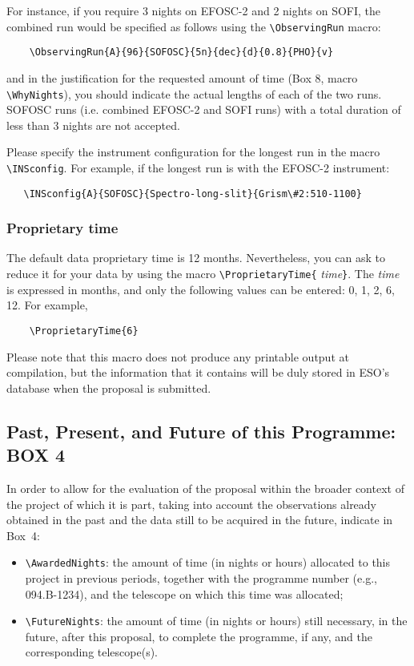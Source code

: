 \documentclass{article}
\begin{document}
For instance, if you require 3 nights on EFOSC-2 and 2 nights on SOFI, the
combined run would be specified as follows using the \verb|\ObservingRun|
 macro:
\begin{verbatim}
    \ObservingRun{A}{96}{SOFOSC}{5n}{dec}{d}{0.8}{PHO}{v}
\end{verbatim}

and in the justification for the requested amount of time
(Box 8, macro \verb|\WhyNights|), you should indicate the actual
lengths of each of the two runs. 
SOFOSC runs (i.e. combined EFOSC-2 and SOFI runs)  with a
total duration of less than 3 nights are not accepted.

Please specify the instrument configuration for the longest run
in the macro \verb|\INSconfig|. For example, if the longest run
is with the EFOSC-2 instrument:
\begin{verbatim}
   \INSconfig{A}{SOFOSC}{Spectro-long-slit}{Grism\#2:510-1100}
\end{verbatim}

\subsubsection*{Proprietary time} 
The default data proprietary time is 12 months.  Nevertheless, you can
ask to reduce it for 
your data by using the macro \verb|\ProprietaryTime{|{\it
    time\/}\verb|}|.  The {\it time\/} is expressed in months, and
only the following values can be entered:  0, 1, 2, 6, 12.  For
example, 
\begin{verbatim}
    \ProprietaryTime{6}
\end{verbatim}

Please note that this macro does not produce any printable output at
compilation, but the information that it contains will be duly stored
in ESO's database when the proposal is submitted.

\subsection{Past, Present, and Future of this Programme:  {\bf BOX 4}}

In order to allow for the evaluation of the proposal within the
broader context of the project of which it is part, taking into
account the observations already obtained in the past and the data
still to be acquired in the future, indicate in Box~4:
\begin{itemize}
\item \verb|\AwardedNights|: the amount of time (in nights or hours)
  allocated to this project in previous periods, together with the
  programme number (e.g., 094.B-1234), and the telescope
  on which this time was allocated;
\item \verb|\FutureNights|: the amount of time (in nights or hours)
  still necessary, in the future, after this proposal, to complete the
  programme, if any, and the corresponding telescope(s). 
\end{itemize}
\end{document}
